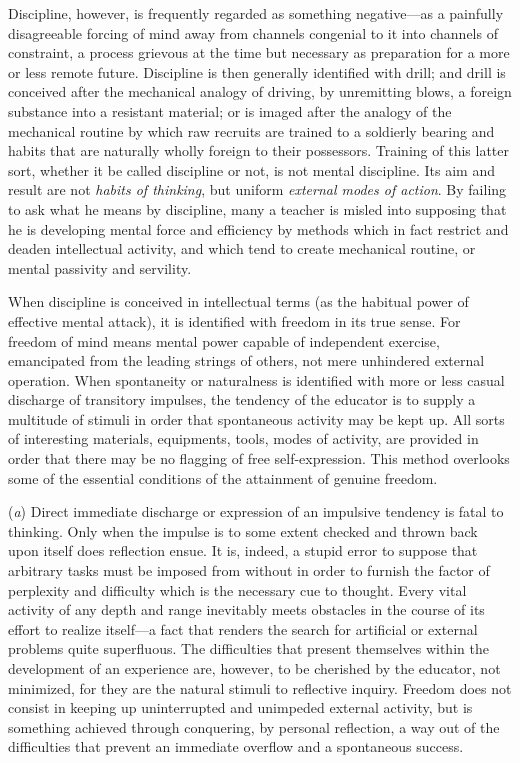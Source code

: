 \documentclass[letterpaper]{book}
\begin{document}

Discipline, however, is frequently regarded as something negative---as a
painfully disagreeable forcing of mind away from channels congenial to
it into channels of constraint, a process grievous at the time but
necessary as preparation for a more or less remote future. Discipline is
then generally identified with drill; and drill is conceived after the
mechanical analogy of driving, by unremitting blows, a foreign substance
into a resistant material; or is imaged after the analogy of the
mechanical routine by which raw recruits are trained to a soldierly
bearing and habits that are naturally wholly foreign to their
possessors. Training of this latter sort, whether it be called
discipline or not, is not mental discipline. Its aim and result are not
\emph{habits of thinking}, but uniform \emph{external modes of action}.
By failing to ask what he means by discipline, many a teacher is misled
into supposing that he is
developing
mental force and efficiency by methods which in fact restrict and deaden
intellectual activity, and which tend to create mechanical routine, or
mental passivity and servility.



When discipline is conceived in intellectual terms (as the habitual
power of effective mental attack), it is identified with freedom in its
true sense. For freedom of mind means mental power capable of
independent exercise, emancipated from the leading strings of others,
not mere unhindered external operation. When spontaneity or naturalness
is identified with more or less casual discharge of transitory impulses,
the tendency of the educator is to supply a multitude of stimuli in
order that spontaneous activity may be kept up. All sorts of interesting
materials, equipments, tools, modes of activity, are provided in order
that there may be no flagging of free self-expression. This method
overlooks some of the essential conditions of the attainment of genuine
freedom.


(\emph{a}) Direct immediate discharge or expression of an impulsive
tendency is fatal to thinking. Only when the impulse is to some extent
checked and thrown back upon itself does reflection ensue. It is,
indeed, a stupid error to suppose that arbitrary tasks must be imposed
from without in order to furnish the factor of perplexity and difficulty
which is the necessary cue to thought. Every vital activity of any depth
and range inevitably meets obstacles in the course of its effort to
realize itself---a fact that renders the search for artificial or
external problems quite superfluous. The difficulties that present
themselves within the development of an experience are, however, to be
cherished by the educator, not minimized, for they are the natural
stimuli
to reflective inquiry. Freedom does not consist in keeping up
uninterrupted and unimpeded external activity, but is something achieved
through conquering, by personal reflection, a way out of the
difficulties that prevent an immediate overflow and a spontaneous
success.
\end{document}
